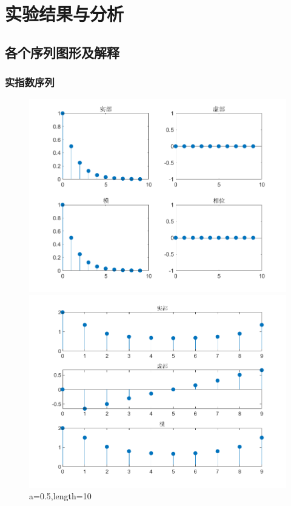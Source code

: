 \documentclass{../source/zjureport}
\begin{document}
    \section{实验结果与分析}
        \subsection{各个序列图形及解释}
            \subsubsection{实指数序列}
                \begin{figure}[H]
                    \centering
                    \begin{minipage}[t]{0.48\textwidth}
                    \centering
                    \includegraphics[width=\textwidth]{figure/实指数序列_a=05,length=10.png}
                    \end{minipage}
                    \begin{minipage}[t]{0.48\textwidth}
                    \centering
                    \includegraphics[width=\textwidth]{figure/频谱_实指数序列_a=05,length=10.png}
                    \end{minipage}
                    \caption{a=0.5,length=10}
                \end{figure}
\end{document}
